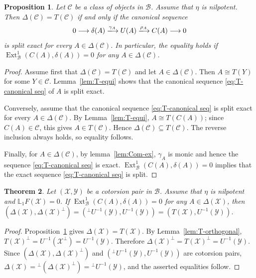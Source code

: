 \documentclass[11pt,reqno]{amsart}
\numberwithin{equation}{section}
\newtheorem{theorem}{Theorem}[section]
\newtheorem{proposition}[theorem]{Proposition}
\newcommand{\cB}{\mathcal B}
\newcommand{\cX}{\mathcal X}
\newcommand{\cY}{\mathcal Y}
\newcommand{\cC}{\mathcal C}
\newcommand{\Ext}{\operatorname{Ext}}
\begin{document}
\begin{proposition}\label{prop:Delta-induced}
Let $\cC$ be a class of objects in $\cB$. Assume that $\eta$ is nilpotent. Then $\Delta(\cC)=T(\cC)$ if and only if the canonical sequence
\begin{equation}\label{eq:T-canonical seq}
0\longrightarrow \delta(A)\xlongrightarrow{\gamma_A}U(A)\xlongrightarrow{\rho_A}C(A)\longrightarrow0
\end{equation}
is split exact for every $A\in\Delta(\cC)$. In particular, the equality holds if
$\Ext^1_\cB(C(A),\delta(A))=0$ for any $A\in\Delta(\cC)$.
\end{proposition}
\begin{proof}
Assume first that $\Delta(\cC)=T(\cC)$ and let $A\in\Delta(\cC)$. Then $A\cong T(Y)$ for some $Y\in\cC$. Lemma~\ref{lem:T-equi} shows that the canonical sequence \eqref{eq:T-canonical seq} of $A$ is split exact.

Conversely, assume that the canonical sequence \eqref{eq:T-canonical seq} is split exact for every $A\in\Delta(\cC)$. By Lemma~\ref{lem:T-equi}, $A\cong T(C(A))$; since $C(A)\in\cC$, this gives $A\in T(\cC)$. Hence $\Delta(\cC)\subseteq T(\cC)$. The reverse inclusion always holds, so equality follows.

Finally, for $A\in \Delta(\cC)$, by lemma~\ref{lem:Com-ex}, $\gamma_A$ is monic and hence the sequence \eqref{eq:T-canonical seq} is exact. $\Ext^1_\cB(C(A),\delta(A))=0$ implies that the exact
sequence \eqref{eq:T-canonical seq} is split.
\end{proof}

\begin{theorem}\label{thm:two-equal}
Let $(\cX,\cY)$ be a cotorsion pair in $\cB$. Assume that $\eta$ is nilpotent and $\mathbb{L}_1F(\cX)=0$. If $\Ext^1_{\cB}(C(A),\delta(A))=0$ for any $A\in \Delta(\cX)$, then
$(\Delta(\cX),\Delta(\cX)^\perp)=({}^\perp U^{-1}(\cY),U^{-1}(\cY))=(T(\cX),U^{-1}(\cY))$.
\end{theorem}
\begin{proof}
Proposition~\ref{prop:Delta-induced} gives $\Delta(\cX)=T(\cX)$. By Lemma~\ref{lem:T-orthogonal},
$
T(\cX)^\perp=U^{-1}(\cX^\perp)=U^{-1}(\cY).
$
Therefore
$
\Delta(\cX)^\perp=T(\cX)^\perp=U^{-1}(\cY).
$
Since $(\Delta(\cX),\Delta(\cX)^\perp)$ and $({}^\perp U^{-1}(\cY),U^{-1}(\cY))$ are cotorsion pairs, $\Delta(\cX)={}^\perp(\Delta(\cX)^\perp)={}^\perp U^{-1}(\cY)$,
and the asserted equalities follow.
\end{proof}
\end{document}
